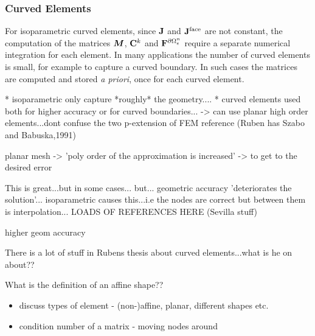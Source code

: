 \subsubsection{Curved Elements}
For isoparametric curved elements, since $\mathbf{J}$ and $\mathbf{J}^{\textrm{face}}$ are not constant, the computation of the matrices $\boldsymbol{M}$, $\mathbf{C}^{k}$ and $\mathbf{F}^{\partial \Omega_e^{n}}$ require a separate numerical integration for each element. In many applications the number of curved elements is small, for example to capture a curved boundary. In such cases the matrices are computed and stored \textit{a priori}, once for each curved element.

* isoparametric only capture *roughly* the geometry....
* curved elements used both for higher accuracy or for curved boundaries...
   -> can use planar high order elements...dont confuse the two
p-extension of FEM reference (Ruben has Szabo and Babuska,1991)

planar mesh -> 'poly order of the approximation is increased' -> to get to the desired error

This is great...but in some cases...
but... geometric accuracy 'deteriorates the solution'...
isoparametric causes this...i.e the nodes are correct but between them is interpolation...
LOADS OF REFERENCES HERE (Sevilla stuff)


higher geom accuracy


There is a lot of stuff in Rubens thesis about curved elements...what is he on about??




What is the definition of an affine shape??




\begin{itemize}
	\item discuss types of element - (non-)affine, planar, different shapes etc.
	\item condition number of a matrix - moving nodes around %
\end{itemize}


